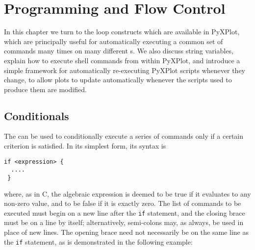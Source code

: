 %
%
%
%
%



\chapter{Programming and Flow Control}

In this chapter we turn to the loop constructs which are available in PyXPlot,
which are principally useful for automatically executing a common set of
commands many times on many different \datafile s. We also discuss string
variables, explain how to execute shell commands from within PyXPlot, and
introduce a simple framework for automatically re-executing PyXPlot scripts
whenever they change, to allow plots to update automatically whenever the
scripts used to produce them are modified.

\section{Conditionals}

The  can be used to conditionally execute a series of commands only
if a certain criterion is satisfied. In its simplest form, its syntax is

\begin{verbatim}
if <expression> {
  ....
 }
\end{verbatim}

\noindent where, as in C, the algebraic expression is deemed to be true if it
evaluates to any non-zero value, and to be false if it is exactly zero. The
list of commands to be executed must begin on a new line after the {\tt if}
statement, and the closing brace must be on a line by itself; alternatively,
semi-colons may, as always, be used in place of new lines. The opening brace
need not necessarily be on the same line as the {\tt if} statement, as is
demonstrated in the following example:

